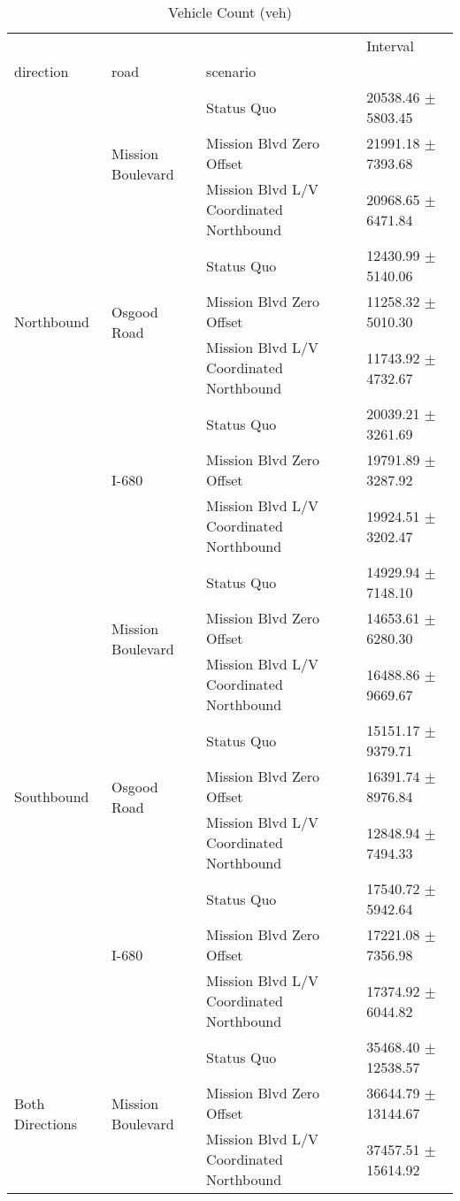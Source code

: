 \begin{table}
\caption{Vehicle Count (veh)}
\begin{tabular}{llll}
\toprule
 &  &  & Interval \\
direction & road & scenario &  \\
\midrule
\multirow[t]{9}{*}{Northbound} & \multirow[t]{3}{*}{Mission Boulevard} & Status Quo & 20538.46 $\pm$ 5803.45 \\
 &  & Mission Blvd Zero Offset & 21991.18 $\pm$ 7393.68 \\
 &  & Mission Blvd L/V Coordinated Northbound & 20968.65 $\pm$ 6471.84 \\
 & \multirow[t]{3}{*}{Osgood Road} & Status Quo & 12430.99 $\pm$ 5140.06 \\
 &  & Mission Blvd Zero Offset & 11258.32 $\pm$ 5010.30 \\
 &  & Mission Blvd L/V Coordinated Northbound & 11743.92 $\pm$ 4732.67 \\
 & \multirow[t]{3}{*}{I-680} & Status Quo & 20039.21 $\pm$ 3261.69 \\
 &  & Mission Blvd Zero Offset & 19791.89 $\pm$ 3287.92 \\
 &  & Mission Blvd L/V Coordinated Northbound & 19924.51 $\pm$ 3202.47 \\
\multirow[t]{9}{*}{Southbound} & \multirow[t]{3}{*}{Mission Boulevard} & Status Quo & 14929.94 $\pm$ 7148.10 \\
 &  & Mission Blvd Zero Offset & 14653.61 $\pm$ 6280.30 \\
 &  & Mission Blvd L/V Coordinated Northbound & 16488.86 $\pm$ 9669.67 \\
 & \multirow[t]{3}{*}{Osgood Road} & Status Quo & 15151.17 $\pm$ 9379.71 \\
 &  & Mission Blvd Zero Offset & 16391.74 $\pm$ 8976.84 \\
 &  & Mission Blvd L/V Coordinated Northbound & 12848.94 $\pm$ 7494.33 \\
 & \multirow[t]{3}{*}{I-680} & Status Quo & 17540.72 $\pm$ 5942.64 \\
 &  & Mission Blvd Zero Offset & 17221.08 $\pm$ 7356.98 \\
 &  & Mission Blvd L/V Coordinated Northbound & 17374.92 $\pm$ 6044.82 \\
\multirow[t]{9}{*}{Both Directions} & \multirow[t]{3}{*}{Mission Boulevard} & Status Quo & 35468.40 $\pm$ 12538.57 \\
 &  & Mission Blvd Zero Offset & 36644.79 $\pm$ 13144.67 \\
 &  & Mission Blvd L/V Coordinated Northbound & 37457.51 $\pm$ 15614.92 \\

\end{tabular}
\end{table}
